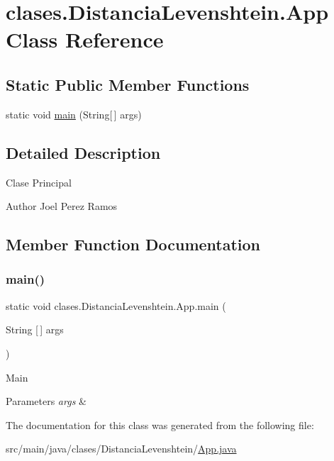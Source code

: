 \hypertarget{classclases_1_1_distancia_levenshtein_1_1_app}{}\section{clases.\+Distancia\+Levenshtein.\+App Class Reference}
\label{classclases_1_1_distancia_levenshtein_1_1_app}
\subsection*{Static Public Member Functions}
\begin{DoxyCompactItemize}
\item 
static void \hyperlink{classclases_1_1_distancia_levenshtein_1_1_app_ac5da9898119949a7134b3a01f98be655}{main} (String\mbox{[}$\,$\mbox{]} args)
\end{DoxyCompactItemize}


\subsection{Detailed Description}
Clase Principal \begin{DoxyAuthor}{Author}
Joel Perez Ramos 
\end{DoxyAuthor}


\subsection{Member Function Documentation}
\hypertarget{classclases_1_1_distancia_levenshtein_1_1_app_ac5da9898119949a7134b3a01f98be655}{}\label{classclases_1_1_distancia_levenshtein_1_1_app_ac5da9898119949a7134b3a01f98be655} 
\subsubsection{\texorpdfstring{main()}{main()}}
{\footnotesize\ttfamily static void clases.\+Distancia\+Levenshtein.\+App.\+main (\begin{DoxyParamCaption}\item[{String \mbox{[}$\,$\mbox{]}}]{args }\end{DoxyParamCaption})\hspace{0.3cm}{\ttfamily [static]}}

Main 
\begin{DoxyParams}{Parameters}
{\em args} & \\
\hline
\end{DoxyParams}


The documentation for this class was generated from the following file\+:\begin{DoxyCompactItemize}
\item 
src/main/java/clases/\+Distancia\+Levenshtein/\hyperlink{_app_8java}{App.\+java}\end{DoxyCompactItemize}
